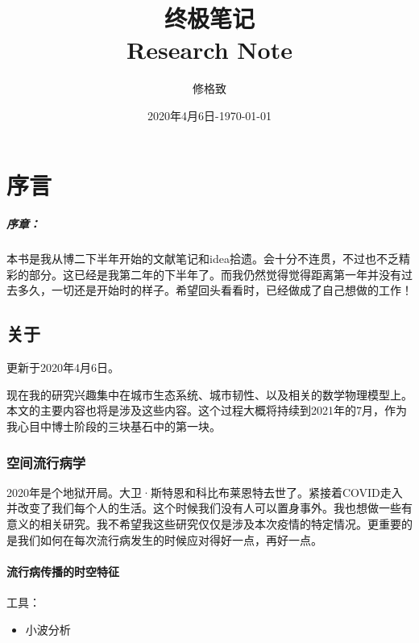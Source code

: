 \documentclass[letterpaper]{book}
\title{终极笔记 \\ Research Note}
\author{修格致}
\date{2020年4月6日-\today}
\begin{document}
\frontmatter

\maketitle

\tableofcontents

\mainmatter

\chapter{序言}

\paragraph{序章：} 本书是我从博二下半年开始的文献笔记和idea拾遗。会十分不连贯，不过也不乏精彩的部分。这已经是我第二年的下半年了。而我仍然觉得觉得距离第一年并没有过去多久，一切还是开始时的样子。希望回头看看时，已经做成了自己想做的工作！


\section{关于}
\textcolor[rgb]{0,0,1}{更新于2020年4月6日。}

现在我的研究兴趣集中在城市生态系统、城市韧性、以及相关的数学物理模型上。本文的主要内容也将是涉及这些内容。这个过程大概将持续到2021年的7月，作为我心目中博士阶段的三块基石中的第一块。

\subsection{空间流行病学}
2020年是个地狱开局。大卫·斯特恩和科比布莱恩特去世了。紧接着COVID走入并改变了我们每个人的生活。这个时候我们没有人可以置身事外。我也想做一些有意义的相关研究。我不希望我这些研究仅仅是涉及本次疫情的特定情况。更重要的是我们如何在每次流行病发生的时候应对得好一点，再好一点。

\subsubsection{流行病传播的时空特征}
工具：
\begin{itemize}
    \item 小波分析
\end{itemize}







\end{document}
